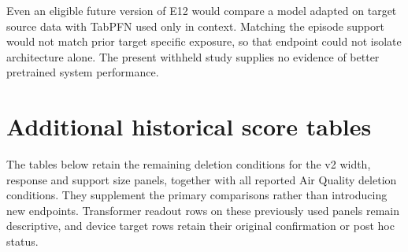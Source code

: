 Even an eligible future version of E12 would compare a model adapted on target source data with TabPFN used only in context. Matching the episode support would not match prior target specific exposure, so that endpoint could not isolate architecture alone. The present withheld study supplies no evidence of better pretrained system performance.

\section{Additional historical score tables}
\label{app:more}

The tables below retain the remaining deletion conditions for the v2 width, response and support size panels, together with all reported Air Quality deletion conditions. They supplement the primary comparisons rather than introducing new endpoints. Transformer readout rows on these previously used panels remain descriptive, and device target rows retain their original confirmation or post hoc status.



